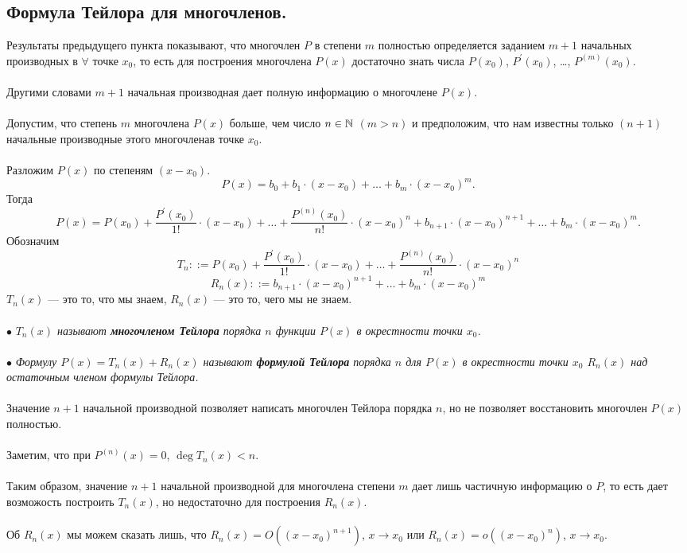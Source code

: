 	\subsection{Формула Тейлора для многочленов.}
	Результаты предыдущего пункта показывают, что многочлен $P$ в степени $m$ полностью определяется заданием $m+1$ начальных производных в $\forall$ точке $x_{0}$, то есть для построения многочлена $P(x)$ достаточно знать числа $P(x_{0})$, $P^\prime(x_{0})$, \dots, $P^{(m)}(x_{0})$.\\\\
	Другими словами $m+1$ начальная производная дает полную информацию о многочлене $P(x)$.\\\\
	Допустим, что степень $m$ многочлена $P(x)$ больше, чем число $n \in \mathbb{N}$ $(m>n)$ и предположим, что нам известны только $(n+1)$ начальные производные этого многочленав точке $x_{0}$.\\\\
	Разложим $P(x)$ по степеням $(x-x_{0})$.
	$$P(x) = b_{0} + b_{1}\cdot (x-x_{0}) + \ldots + b_{m}\cdot (x-x_{0})^m.$$
	Тогда $$P(x) = P(x_{0}) + \frac{P^\prime(x_{0})}{1!}\cdot (x-x_{0}) + \ldots + \frac{P^{(n)}(x_{0})}{n!}\cdot (x-x_{0})^n + b_{n+1}\cdot(x-x_{0})^{n+1} + \ldots + b_{m}\cdot (x-x_{0})^m.$$
	Обозначим $$T_{n} ::= P(x_{0}) + \frac{P^\prime(x_{0})}{1!}\cdot (x-x_{0}) + \ldots + \frac{P^{(n)}(x_{0})}{n!}\cdot (x-x_{0})^n$$
	$$R_{n}(x) ::= b_{n+1}\cdot(x-x_{0})^{n+1} + \ldots + b_{m}\cdot (x-x_{0})^m$$
	$T_{n}(x)$ --- это то, что мы знаем,
	$R_{n}(x)$ --- это то, чего мы не знаем.\\\\
	$\bullet$ \textit{$T_{n}(x)$ называют \textbf{многочленом Тейлора} порядка $n$ функции $P(x)$ в окрестности точки $x_{0}$.}\\\\
	$\bullet$ \textit{Формулу $P(x) = T_{n}(x) + R_{n}(x)$ называют \textbf{формулой Тейлора} порядка $n$ для $P(x)$ в окрестности точки $x_{0}$ $R_{n}(x)$ над остаточным членом формулы Тейлора.}\\\\
	Значение $n+1$ начальной производной позволяет написать многочлен Тейлора порядка $n$, но не позволяет восстановить многочлен $P(x)$ полностью.\\\\
	Заметим, что при $P^{(n)}(x) = 0$, $\deg{T_{n}(x)}<n$.\\\\
	Таким образом, значение $n+1$ начальной производной для многочлена степени $m$ дает лишь частичную информацию о $P$, то есть дает возможость построить $T_{n}(x)$, но недостаточно для построения $R_{n}(x)$.\\\\
	Об $R_{n}(x)$ мы можем сказать лишь, что $R_{n}(x) = O((x-x_{0})^{n+1})$, $x \rightarrow x_{0}$ или $R_{n}(x) = o((x-x_{0})^n)$, $x \rightarrow  x_{0}$.
